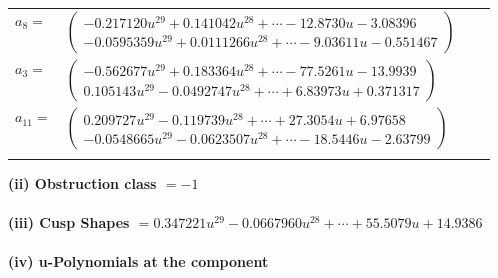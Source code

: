\documentclass[1p]{elsarticle_modified}
\theoremstyle{definition}
\begin{document}
\begin{tabular}{m{7pt} m{180pt} m{7pt} m{180pt} }
\flushright $a_{8}=$&$\begin{pmatrix}-0.217120 u^{29}+0.141042 u^{28}+\cdots-12.8730 u-3.08396\\-0.0595359 u^{29}+0.0111266 u^{28}+\cdots-9.03611 u-0.551467\end{pmatrix}$ \\
\flushright $a_{3}=$&$\begin{pmatrix}-0.562677 u^{29}+0.183364 u^{28}+\cdots-77.5261 u-13.9939\\0.105143 u^{29}-0.0492747 u^{28}+\cdots+6.83973 u+0.371317\end{pmatrix}$ \\
\flushright $a_{11}=$&$\begin{pmatrix}0.209727 u^{29}-0.119739 u^{28}+\cdots+27.3054 u+6.97658\\-0.0548665 u^{29}-0.0623507 u^{28}+\cdots-18.5446 u-2.63799\end{pmatrix}$\\&\end{tabular}
\flushleft \textbf{(ii) Obstruction class $= -1$}\\~\\
\flushleft \textbf{(iii) Cusp Shapes $= 0.347221 u^{29}-0.0667960 u^{28}+\cdots+55.5079 u+14.9386$}\\~\\
\newpage\renewcommand{\arraystretch}{1}
\flushleft \textbf{(iv) u-Polynomials at the component}\newline \\
\end{document}
